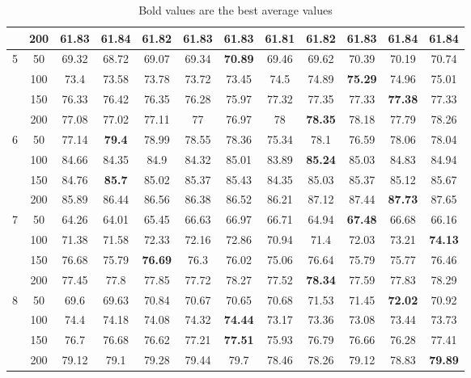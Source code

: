 \begin{table}[htbp]
{\begin{tabular}{|c|c|c|c|c|c|c|c|c|c|c|c|}
    & 200 & 61.83 & \textbf{61.84} & 61.82 & 61.83 & 61.83 & 61.81 & 61.82 & 61.83 & \textbf{61.84} & \textbf{61.84} \\ \hline
    5 & 50 & 69.32 & 68.72 & 69.07 & 69.34 & \textbf{70.89} & 69.46 & 69.62 & 70.39 & 70.19 & 70.74 \\ 
    & 100 & 73.4 & 73.58 & 73.78 & 73.72 & 73.45 & 74.5 & 74.89 & \textbf{75.29} & 74.96 & 75.01 \\ 
    & 150 & 76.33 & 76.42 & 76.35 & 76.28 & 75.97 & 77.32 & 77.35 & 77.33 & \textbf{77.38} & 77.33 \\ 
    & 200 & 77.08 & 77.02 & 77.11 & 77 & 76.97 & 78 & \textbf{78.35} & 78.18 & 77.79 & 78.26 \\ \hline
    6 & 50 & 77.14 & \textbf{79.4} & 78.99 & 78.55 & 78.36 & 75.34 & 78.1 & 76.59 & 78.06 & 78.04 \\ 
    & 100 & 84.66 & 84.35 & 84.9 & 84.32 & 85.01 & 83.89 & \textbf{85.24} & 85.03 & 84.83 & 84.94 \\ 
    & 150 & 84.76 & \textbf{85.7} & 85.02 & 85.37 & 85.43 & 84.35 & 85.03 & 85.37 & 85.12 & 85.67 \\ 
    & 200 & 85.89 & 86.44 & 86.56 & 86.38 & 86.52 & 86.21 & 87.12 & 87.44 & \textbf{87.73} & 87.65 \\ \hline
    7 & 50 & 64.26 & 64.01 & 65.45 & 66.63 & 66.97 & 66.71 & 64.94 & \textbf{67.48} & 66.68 & 66.16 \\ 
    & 100 & 71.38 & 71.58 & 72.33 & 72.16 & 72.86 & 70.94 & 71.4 & 72.03 & 73.21 & \textbf{74.13} \\ 
    & 150 & 76.68 & 75.79 & \textbf{76.69} & 76.3 & 76.02 & 75.06 & 76.64 & 75.79 & 75.77 & 76.46 \\ 
    & 200 & 77.45 & 77.8 & 77.85 & 77.72 & 78.27 & 77.52 & \textbf{78.34} & 77.59 & 77.83 & 78.29 \\ \hline
    8 & 50 & 69.6 & 69.63 & 70.84 & 70.67 & 70.65 & 70.68 & 71.53 & 71.45 & \textbf{72.02} & 70.92 \\ 
    & 100 & 74.4 & 74.18 & 74.08 & 74.32 & \textbf{74.44} & 73.17 & 73.36 & 73.08 & 73.44 & 73.73 \\ 
    & 150 & 76.7 & 76.68 & 76.62 & 77.21 & \textbf{77.51} & 75.93 & 76.79 & 76.66 & 76.28 & 77.41 \\ 
    & 200 & 79.12 & 79.1 & 79.28 & 79.44 & 79.7 & 78.46 & 78.26 & 79.12 & 78.83 & \textbf{79.89} \\ \hline
    \end{tabular}}
    \caption*{Bold values are the best average values}
    \label{exp:literature_cage_ratio}
\end{table}
    